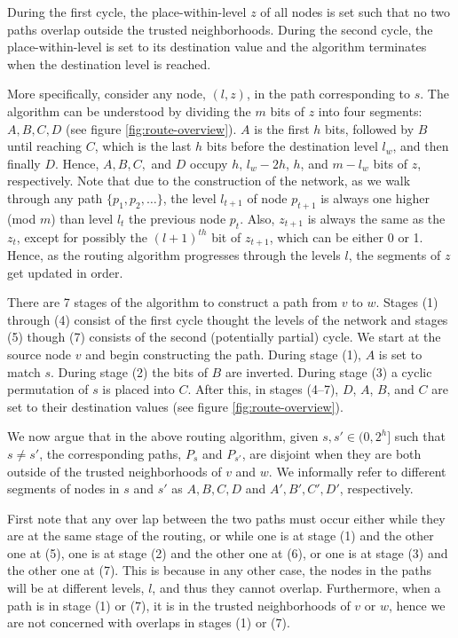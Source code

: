 \documentclass[prodmode,permissions]{acmsmall-ec16}
\begin{document}
During the first cycle, the place-within-level $z$ of all nodes is set such that
no two paths overlap outside the trusted neighborhoods.
During the second cycle, the place-within-level is set to its destination value
and the algorithm terminates when the destination level is reached.

More specifically, consider any node, $(l,z)$, in the path corresponding to $s$. The algorithm can be understood by dividing the $m$ bits of
$z$ into four segments: $A, B, C, D$ (see figure \ref{fig:route-overview}).
$A$ is the first $h$ bits, followed by $B$ until reaching $C$, which is the last $h$ bits before
the destination level $l_w$, and then finally $D$. Hence, $A, B, C, $ and $D$ occupy $h$, $l_w - 2h$, $h$, and $m - l_w$ bits of $z$, respectively. 
Note that due to the construction of the network, as we walk through any path $\{p_1, p_2, \dots\}$, the level $l_{t+1}$ of node $p_{t+1}$ is always one higher (mod $m$) than level $l_t$ the previous node $p_t$. Also, $z_{t+1}$ is always the same as the $z_t$, except for possibly the $(l+1)^{th}$ bit of $z_{t+1}$, which can be either 0 or 1. Hence, as the routing algorithm progresses through the levels $l$, the segments of $z$ get updated in order. 

There are 7 stages of the algorithm to construct a path from $v$ to $w$. Stages (1) through (4) consist of the first cycle thought the levels of the network and stages (5) though (7) consists of the second (potentially partial) cycle. We start at the source node $v$ and begin constructing the path. During stage (1), $A$ is set to match $s$. During stage (2) the bits of $B$ are inverted. During stage (3) a cyclic permutation of $s$ is placed into $C$. After this, in stages (4--7), $D$, $A$, $B$, and $C$ are set to their destination values (see figure \ref{fig:route-overview}).

We now argue that in the above routing algorithm, given $s, s' \in (0, 2^h]$ such that $s \neq s'$, the corresponding paths, $P_s$ and $P_{s'}$, are disjoint when they are both outside of the trusted neighborhoods of $v$ and $w$. We informally refer to different segments of nodes in $s$ and $s'$ as $A,B,C,D$ and $A',B',C',D'$, respectively. 

First note that any over lap between the two paths must occur either while they are at the same stage of the routing, or while one is at stage (1) and the other one at (5), one is at stage (2) and the other one at (6), or one is at stage (3) and the other one at (7). This is because in any other case, the nodes in the paths will be at different levels, $l$, and thus they cannot overlap. Furthermore, when a path is in stage (1) or (7), it is in the trusted neighborhoods of $v$ or $w$, hence we are not concerned with overlaps in stages (1) or (7). 
\end{document}
